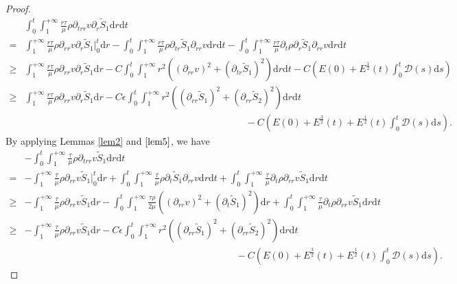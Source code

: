 \documentclass[10pt,reqno]{amsart}
\numberwithin{equation}{section}
\begin{document}
\begin{proof}
\begin{equation}
			\begin{aligned}
				&\int_{0}^{t}\int_{1}^{+\infty}\frac{r\tau}{\mu}\rho\partial_{trr}v
				\partial_{r} \tilde{S}_1\mathrm{d}r\mathrm{d}t\\
				=&\int_{1}^{+\infty} \frac{r\tau}{\mu}\rho\partial_{rr}v
				\partial_{r} \tilde{S}_1\big|_0^t\mathrm{d}r
				-\int_{0}^{t}\int_{1}^{+\infty} \frac{r\tau}{\mu}
				\rho\partial_{tr} \tilde{S}_1\partial_{rr}v\mathrm{d}r\mathrm{d}t
				-\int_{0}^{t}\int_{1}^{+\infty} \frac{r\tau}{\mu}
				\partial_{t}\rho\partial_{r} \tilde{S}_1 \partial_{rr}v\mathrm{d}r\mathrm{d}t\\
				\geq&\int_{1}^{+\infty} \frac{r\tau}{\mu}\rho\partial_{rr}v
				\partial_{r} \tilde{S}_1\mathrm{d}r
				-C\int_{0}^{t}\int_{1}^{+\infty} r^2((\partial_{rr}v)^2+(\partial_{tr} \tilde{S}_1)^2)\mathrm{d}r\mathrm{d}t
				-C\left(E(0)+ E^{\frac{1}{2}}(t) \int_{0}^{t}\mathcal{D}(s)\mathrm{d}s\right)\\
				\geq&\int_{1}^{+\infty} \frac{r\tau}{\mu}\rho\partial_{rr}v
				\partial_{r} \tilde{S}_1\mathrm{d}r
				-C\epsilon\int_{0}^{t}\int_{1}^{+\infty}r^2((\partial_{rr} \tilde{S}_1)^2
				+(\partial_{rr} \tilde{S}_2)^2)\mathrm{d}r\mathrm{d}t\\
				&\qquad\qquad\qquad\qquad\qquad\qquad\qquad\qquad\qquad\qquad\qquad\quad-C\left(E(0)+ E^{\frac{3}{2}}(t)+ E^{\frac{1}{2}}(t) \int_{0}^{t}\mathcal{D}(s)\mathrm{d}s\right).
			\end{aligned}
		\end{equation}
		By applying Lemmas \ref{lem2} and  $\ref{lem5}$, we have	
			\begin{align*}
				&-\int_{0}^{t}\int_{1}^{+\infty}\frac{\tau}{\mu}\rho\partial_{trr}v
				\tilde{S}_1\mathrm{d}r\mathrm{d}t\\
				=&-\int_{1}^{+\infty} \frac{\tau}{\mu}\rho\partial_{rr}v \tilde{S}_1\big|_0^t\mathrm{d}r
				+\int_{0}^{t}\int_{1}^{+\infty} \frac{\tau}{\mu}
				\rho \partial_{t}\tilde{S}_1\partial_{rr}v\mathrm{d}r\mathrm{d}t +\int_{0}^{t}\int_{1}^{+\infty} \frac{\tau}{\mu}
				\partial_{t}\rho \partial_{rr}v\tilde{S}_1\mathrm{d}r\mathrm{d}t\\
				\geq&-\int_{1}^{+\infty} \frac{\tau}{\mu}\rho\partial_{rr}v \tilde{S}_1\mathrm{d}r
				-\int_{0}^{t}\int_{1}^{+\infty} \frac{\tau\rho}{2\mu}((\partial_{rr}v)^2
				+(\partial_{t}\tilde{S}_1)^2) \mathrm{d}r
				+\int_{0}^{t}\int_{1}^{+\infty} \frac{\tau}{\mu}
				\partial_{t}\rho \partial_{rr}v\tilde{S}_1\mathrm{d}r\mathrm{d}t\\
				\geq&-\int_{1}^{+\infty} \frac{\tau}{\mu}\rho\partial_{rr}v \tilde{S}_1\mathrm{d}r
				-C\epsilon\int_{0}^{t}\int_{1}^{+\infty}r^2((\partial_{rr} \tilde{S}_1)^2
				+(\partial_{rr} \tilde{S}_2)^2)\mathrm{d}r\mathrm{d}t\\
				&\qquad\qquad\qquad\qquad\qquad\qquad\qquad\qquad\qquad\qquad\qquad-C\left(E(0)+ E^{\frac{3}{2}}(t)+ E^{\frac{1}{2}}(t) \int_{0}^{t}\mathcal{D}(s)\mathrm{d}s\right).
			\end{align*}
	

\end{proof}
\end{document}
